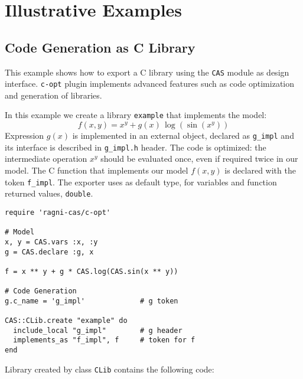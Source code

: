 
\section{Illustrative Examples}
\label{sec:examples}

\subsection{Code Generation as C Library}
This example shows how to export a C library using the \texttt{CAS} module as design interface. \texttt{c-opt} plugin implements advanced features such as code optimization and generation of libraries.

In this example we create a library \texttt{example} that implements the model:
\begin{equation}
f(x, y) = x^y + g(x)\, \log(\sin(x^y))
\end{equation}
Expression $g(x)$ is implemented in an external object, declared as \texttt{g\_impl} and its interface is described in \texttt{g\_impl.h} header. The code is optimized: the intermediate operation $x^y$ should be evaluated once, even if required twice in our model. The C function that implements our model $f(x,y)$ is declared with the token \texttt{f\_impl}. The exporter uses as default type, for variables and function returned values, \texttt{double}.

\begin{lstlisting}[caption={Calling optimized-C exporter for library generation},label={code:example-exporting-C-1}]
require 'ragni-cas/c-opt'

# Model
x, y = CAS.vars :x, :y
g = CAS.declare :g, x

f = x ** y + g * CAS.log(CAS.sin(x ** y))

# Code Generation
g.c_name = 'g_impl'             # g token

CAS::CLib.create "example" do
  include_local "g_impl"        # g header
  implements_as "f_impl", f     # token for f
end
\end{lstlisting}
Library created by class \texttt{CLib} contains the following code:

\noindent%
  \begin{minipage}{.5\textwidth}
    
  \end{minipage}\hfill
  \begin{minipage}{.5\textwidth}
    
  \end{minipage}

